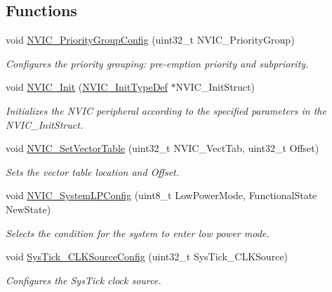 \subsection*{Functions}
\begin{DoxyCompactItemize}
\item 
void \hyperlink{group___m_i_s_c___private___functions_gadfb1f34f803ce54c976643db8c484442}{N\+V\+I\+C\+\_\+\+Priority\+Group\+Config} (uint32\+\_\+t N\+V\+I\+C\+\_\+\+Priority\+Group)
\begin{DoxyCompactList}\small\item\em Configures the priority grouping\+: pre-\/emption priority and subpriority. \end{DoxyCompactList}\item 
void \hyperlink{group___m_i_s_c___private___functions_ga4ab373ed0870c06fca5eb51d639adf41}{N\+V\+I\+C\+\_\+\+Init} (\hyperlink{struct_n_v_i_c___init_type_def}{N\+V\+I\+C\+\_\+\+Init\+Type\+Def} $\ast$N\+V\+I\+C\+\_\+\+Init\+Struct)
\begin{DoxyCompactList}\small\item\em Initializes the N\+V\+IC peripheral according to the specified parameters in the N\+V\+I\+C\+\_\+\+Init\+Struct. \end{DoxyCompactList}\item 
void \hyperlink{group___m_i_s_c___private___functions_ga1145208ad70edfc2fab19b8b8ef1b1a1}{N\+V\+I\+C\+\_\+\+Set\+Vector\+Table} (uint32\+\_\+t N\+V\+I\+C\+\_\+\+Vect\+Tab, uint32\+\_\+t Offset)
\begin{DoxyCompactList}\small\item\em Sets the vector table location and Offset. \end{DoxyCompactList}\item 
void \hyperlink{group___m_i_s_c___private___functions_gae21011c5232f5b8f366acbecd12a1d4a}{N\+V\+I\+C\+\_\+\+System\+L\+P\+Config} (uint8\+\_\+t Low\+Power\+Mode, Functional\+State New\+State)
\begin{DoxyCompactList}\small\item\em Selects the condition for the system to enter low power mode. \end{DoxyCompactList}\item 
void \hyperlink{group___m_i_s_c___private___functions_ga2777d255bb06ad62bb6372a9db1ff385}{Sys\+Tick\+\_\+\+C\+L\+K\+Source\+Config} (uint32\+\_\+t Sys\+Tick\+\_\+\+C\+L\+K\+Source)
\begin{DoxyCompactList}\small\item\em Configures the Sys\+Tick clock source. \end{DoxyCompactList}\end{DoxyCompactItemize}


